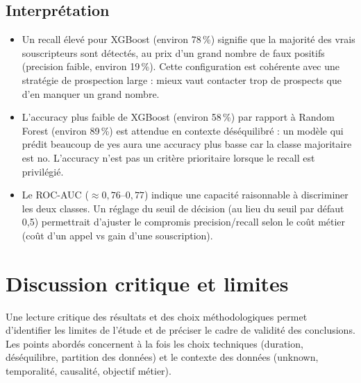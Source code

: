 \documentclass[11pt,a4paper]{article}
\begin{document}
\subsection{Interprétation}
\begin{itemize}
  \item Un recall élevé pour XGBoost (environ 78\,\%) signifie que la majorité des vrais souscripteurs sont détectés, au prix d'un grand nombre de faux positifs (precision faible, environ 19\,\%). Cette configuration est cohérente avec une stratégie de prospection large : mieux vaut contacter trop de prospects que d'en manquer un grand nombre.
  \item L'accuracy plus faible de XGBoost (environ 58\,\%) par rapport à Random Forest (environ 89\,\%) est attendue en contexte déséquilibré : un modèle qui prédit beaucoup de yes aura une accuracy plus basse car la classe majoritaire est no. L'accuracy n'est pas un critère prioritaire lorsque le recall est privilégié.
  \item Le ROC-AUC ($\approx 0{,}76$--$0{,}77$) indique une capacité raisonnable à discriminer les deux classes. Un réglage du seuil de décision (au lieu du seuil par défaut 0,5) permettrait d'ajuster le compromis precision/recall selon le coût métier (coût d'un appel vs gain d'une souscription).
\end{itemize}

\section{Discussion critique et limites}

Une lecture critique des résultats et des choix méthodologiques permet d'identifier les limites de l'étude et de préciser le cadre de validité des conclusions. Les points abordés concernent à la fois les choix techniques (duration, déséquilibre, partition des données) et le contexte des données (unknown, temporalité, causalité, objectif métier).
\end{document}
